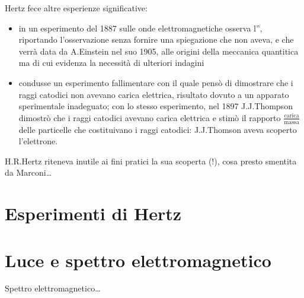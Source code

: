 \documentclass[letterpaper,10pt,italian]{jupyterBook}
\begin{document}
\sphinxAtStartPar
{} 

\sphinxAtStartPar
Hertz fece altre esperienze significative:
\begin{itemize}
\item {} 
\sphinxAtStartPar
in un esperimento del 1887 sulle onde elettromagnetiche osserva l”, riportando l’osservazione senza fornire una spiegazione \sphinxhyphen{} che non aveva, e che verrà data da A.Einstein nel suo  1905, alle origini della meccanica quantitica \sphinxhyphen{} ma di cui evidenza la necessità di ulteriori indagini

\item {} 
\sphinxAtStartPar
condusse un esperimento fallimentare con il quale pensò di dimostrare che i raggi catodici non avevano carica elettrica, risultato dovuto a un apparato sperimentale inadeguato; con lo stesso esperimento, nel 1897 J.J.Thompson dimostrò che i raggi catodici avevano carica elettrica e stimò il rapporto \(\frac{\text{carica}}{\text{massa}}\) delle particelle che costituivano i raggi catodici: J.J.Thomson aveva scoperto l’elettrone.

\end{itemize}

\sphinxAtStartPar
{}  H.R.Hertz riteneva inutile ai fini pratici la sua scoperta (!), cosa presto smentita da Marconi…

\sphinxAtStartPar
{}  


\section{Esperimenti di Hertz}
\label{\detokenize{ch/electromagnetism/em-waves:esperimenti-di-hertz}}\label{\detokenize{ch/electromagnetism/em-waves:physics-hs-electromagnetism-em-waves-hertz}}

\section{Luce e spettro elettromagnetico}
\label{\detokenize{ch/electromagnetism/em-waves:luce-e-spettro-elettromagnetico}}\label{\detokenize{ch/electromagnetism/em-waves:physics-hs-electromagnetism-em-waves-light}}
\sphinxAtStartPar
Spettro elettromagnetico…
\end{document}
